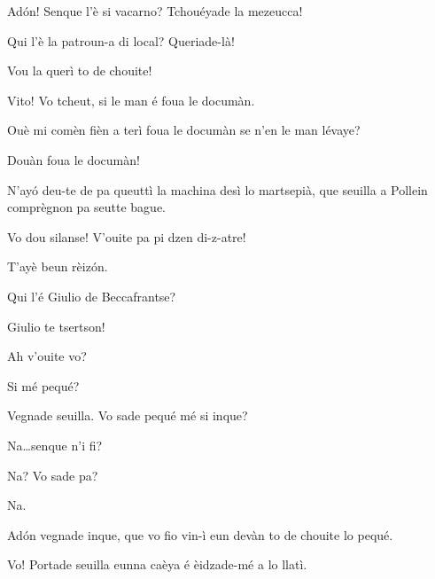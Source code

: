 \begin{drama}

\Valletspeaks Ad\'on! Senque l’è si vacarno? Tchouéyade la mezeucca!


\Valletspeaks{} Qui l’è la patroun-a di local? Queriade-là!

\Helenespeaks Vou la querì to de chouite!

\Valletspeaks Vito!  Vo tcheut, si le man é foua le documàn.


\Michelspeaks Ouè mi comèn fièn a terì foua le documàn se n'en le man lévaye?

\Valletspeaks Douàn foua le documàn!

\Pierrespeaks {} N'ay\'o deu-te de pa queuttì la machina desì lo martsepià, que seuilla a Pollein comprègnon pa seutte bague.

\Valletspeaks Vo dou silanse! V'ouite pa pi dzen di-z-atre!

\Louisspeaks{} T'ayè beun rèiz\'on.

\Valletspeaks Qui l’é Giulio de Beccafrantse? 


\Michelspeaks Giulio te tsertson!


\Valletspeaks Ah v'ouite vo?

\Giuliospeaks{} Si mé pequé? 

\Valletspeaks Vegnade seuilla. Vo sade pequé mé si inque?

\Giuliospeaks Na\ldots senque n'i fi?

\Valletspeaks Na? Vo sade pa?

\Giuliospeaks Na.

\Valletspeaks Ad\'on vegnade inque, que vo fio vin-ì eun devàn to de chouite lo pequé.


\Valletspeaks{} Vo! Portade seuilla eunna caèya é èidzade-mé a lo llatì.



\end{drama}
